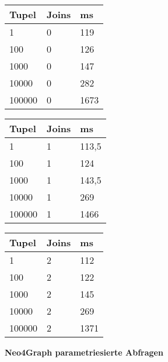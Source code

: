 \begin{table}[H]
\centering
\begin{subtable}[t]{0.3\textwidth}
\centering
\begin{tabular}{|l|l|l|}
\hline
Tupel  & Joins & ms    \\ \hline
1      & 0     & 119  \\ \hline
100    & 0     & 126   \\ \hline
1000   & 0     & 147   \\ \hline
10000  & 0     & 282   \\ \hline
100000 & 0     &  1673\\ \hline
\end{tabular}
\end{subtable}%
\hfill
\begin{subtable}[t]{0.3\textwidth}
\centering
\begin{tabular}{|l|l|l|}
\hline
Tupel  & Joins & ms    \\ \hline
1      & 1     & 113,5   \\ \hline
100    & 1     & 124   \\ \hline
1000   & 1     & 143,5   \\ \hline
10000  & 1     & 269 \\ \hline
100000 & 1     & 1466   \\ \hline
\end{tabular}
\end{subtable}%
\hfill
\begin{subtable}[t]{0.3\textwidth}
\centering
\begin{tabular}{|l|l|l|}
\hline
Tupel  & Joins & ms    \\ \hline
1      & 2     & 112   \\ \hline
100    & 2     & 122 \\ \hline
1000   & 2     & 145   \\ \hline
10000  & 2     & 269   \\ \hline
100000 & 2     & 1371 \\ \hline
\end{tabular}
\end{subtable}
\end{table}
\noindent
\textbf{Neo4Graph parametriesierte Abfragen}
